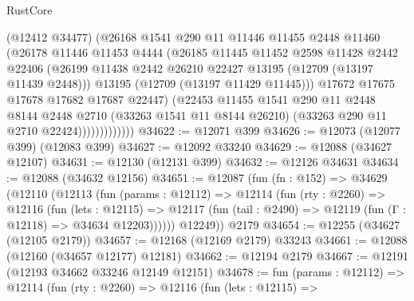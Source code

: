 \begin{lexlean}{RustCore}
\begin{coremodule}
                        (@12412 @34477)
                        (@26168
                          @1541
                          @290
                          @11
                          @11446
                          @11455
                          @2448
                          @11460
                          (@26178
                            @11446
                            @11453
                            @4444
                            (@26185
                              @11445
                              @11452
                              @2598
                              @11428
                              @2442
                              @22406
                              (@26199
                                @11438
                                @2442
                                @26210
                                @22427
                                @13195
                                (@12709 (@13197 @11439 @2448)))
                              @13195
                              (@12709 (@13197 @11429 @11445)))
                            @17672
                            @17675
                            @17678
                            @17682
                            @17687
                            @22447)
                          (@22453
                            @11455
                            @1541
                            @290
                            @11
                            @2448
                            @8144
                            @2448
                            @2710
                            (@33263 @1541 @11 @8144 @26210)
                            (@33263 @290 @11 @2710 @22424)))))))))))))
@34622 := @12071 @399
@34626 := @12073 (@12077 @399) (@12083 @399)
@34627 := @12092 @33240
@34629 := @12088 (@34627 @12107)
@34631 := @12130 (@12131 @399)
@34632 := @12126 @34631
@34634 := @12088 (@34632 @12156)
@34651 := @12087
    (fun (fn : @152) =>
    @34629
      (@12110
        (@12113
          (fun (params : @12112) =>
          @12114
            (fun (rty : @2260) =>
            @12116
              (fun (lets : @12115) =>
              @12117 (fun (tail : @2490) => @12119 (fun (Γ : @12118) => @34634 @12203))))))
        @12249))
    @2179
@34654 := @12255 (@34627 (@12105 @2179))
@34657 := @12168 (@12169 @2179) @33243
@34661 := @12088 (@12160 (@34657 @12177) @12181)
@34662 := @12194 @2179
@34667 := @12191 (@12193 @34662 @33246 @12149 @12151)
@34678 := fun (params : @12112) =>
  @12114
    (fun (rty : @2260) =>
    @12116
      (fun (lets : @12115) =>

\end{coremodule}
\end{lexlean}
